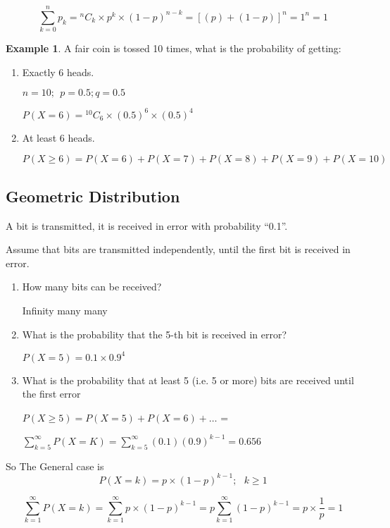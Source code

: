 \documentclass[12pt]{article}
\theoremstyle{definition}
\newtheorem{exmp}{Example}[section]
\newcommand*{\Comb}[2]{{}^{#1}C_{#2}}%
\begin{document}
\begin{equation}
    \sum_{k = 0}^{n} p_k  = \Comb{n}{k} \times p^k \times (1-p)^{n - k} = [(p)+(1-p)]^n = 1 ^ n = 1
\end{equation}    
\begin{exmp}
A fair coin is tossed 10 times, what is the probability of getting:
\begin{enumerate}
    \item  Exactly 6 heads.
        \begin{center}
            $ n = 10; \ \ p = 0.5; q = 0.5 $ 
        \end{center}   
        \begin{center}
            $P(X = 6) = \Comb{10}{6} \times (0.5)^6 \times (0.5)^4   $ 
        \end{center}   
    \item  At least 6 heads.
        \begin{center}
            $P(X \geq 6) = P(X = 6) + P(X = 7) + P(X = 8) + P(X = 9) + P(X = 10)  $
        \end{center}   
\end{enumerate}
\end{exmp}    

\subsection{Geometric Distribution}

A bit is transmitted, it is received in error with probability “0.1”.

Assume that bits are transmitted independently, until the first bit is received
in error.
\begin{enumerate}

    \item How many bits can be received?
        \begin{center}
            Infinity many many
        \end{center}
    \item What is the probability that the 5-th bit is received in error?
        \begin{center}
            $  P(X = 5) = 0.1 \times 0.9^4 $
        \end{center}
    \item What is the probability that at least 5 (i.e. 5 or more) bits are received until the first error
        \begin{center}
            $  P(X \geq 5) = P(X = 5) + P(X = 6) + \dots $  =
        \end{center}
        \begin{center}
            $  \displaystyle \sum_{k = 5}^{\infty} P(X = K) = \sum_{k = 5}^{\infty}(0.1)(0.9)^{k-1} = 0.656$
        \end{center}

\end{enumerate}
So The General case is 
\begin{equation}
    P(X = k) = p \times (1 - p)^{k-1} ; \ \ \ k \geq 1
\end{equation}    

\begin{equation}
    \displaystyle \sum_{k = 1}^{\infty}   P(X = k) = \sum_{k = 1}^{\infty}p \times (1 - p)^{k-1}
    = p\sum_{k = 1}^{\infty}(1 - p)^{k-1} = p \times \frac{1}{p} = 1
\end{equation}    
\end{document}
